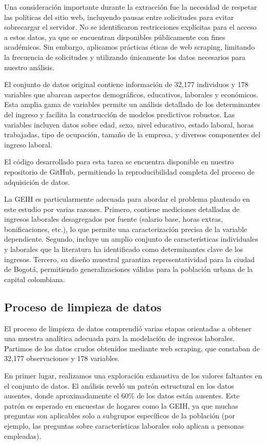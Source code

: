 \documentclass[12pt,a4paper,onecolumn]{article}
\begin{document}
Una consideración importante durante la extracción fue la necesidad de respetar las políticas del sitio web, incluyendo pausas entre solicitudes para evitar sobrecargar el servidor. No se identificaron restricciones explícitas para el acceso a estos datos, ya que se encuentran disponibles públicamente con fines académicos. Sin embargo, aplicamos prácticas éticas de web scraping, limitando la frecuencia de solicitudes y utilizando únicamente los datos necesarios para nuestro análisis.

El conjunto de datos original contiene información de 32,177 individuos y 178 variables que abarcan aspectos demográficos, educativos, laborales y económicos. Esta amplia gama de variables permite un análisis detallado de los determinantes del ingreso y facilita la construcción de modelos predictivos robustos. Las variables incluyen datos sobre edad, sexo, nivel educativo, estado laboral, horas trabajadas, tipo de ocupación, tamaño de la empresa, y diversos componentes del ingreso laboral.

El código desarrollado para esta tarea se encuentra disponible en nuestro repositorio de GitHub, permitiendo la reproducibilidad completa del proceso de adquisición de datos.

La GEIH es particularmente adecuada para abordar el problema planteado en este estudio por varias razones. Primero, contiene mediciones detalladas de ingresos laborales desagregados por fuente (salario base, horas extras, bonificaciones, etc.), lo que permite una caracterización precisa de la variable dependiente. Segundo, incluye un amplio conjunto de características individuales y laborales que la literatura ha identificado como determinantes clave de los ingresos. Tercero, su diseño muestral garantiza representatividad para la ciudad de Bogotá, permitiendo generalizaciones válidas para la población urbana de la capital colombiana.

\subsection{Proceso de limpieza de datos}

El proceso de limpieza de datos comprendió varias etapas orientadas a obtener una muestra analítica adecuada para la modelación de ingresos laborales. Partimos de los datos crudos obtenidos mediante web scraping, que constaban de 32,177 observaciones y 178 variables.

En primer lugar, realizamos una exploración exhaustiva de los valores faltantes en el conjunto de datos. El análisis reveló un patrón estructural en los datos ausentes, donde aproximadamente el 60\% de los datos están ausentes. Este patrón es esperado en encuestas de hogares como la GEIH, ya que muchas preguntas son aplicables solo a subgrupos específicos de la población (por ejemplo, las preguntas sobre características laborales solo aplican a personas empleadas).
\end{document}

